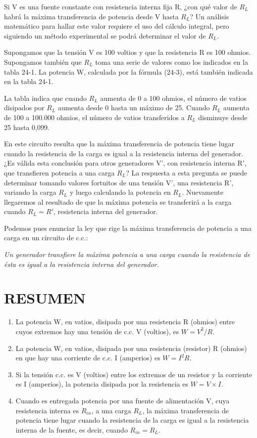 \documentclass[12pt]{article}
\begin{document}
Si V es una fuente constante con resistencia interna fija R, ¿con qué valor de $R_L$ habrá la máxima transferencia de potencia desde V hasta $R_L$? Un análisis matemático para hallar este valor requiere el uso del cálculo integral, pero siguiendo un método experimental se podrá determinar el valor de $R_L$.

Supongamos que la tensión V es 100 voltios y que la resistencia R es 100 ohmios. Supongamos también que $R_L$ toma una serie de valores como los indicados en la tabla 24-1. La potencia W, calculada por la fórmula (24-3), está también indicada en la tabla 24-1.

La tabla indica que cuando $R_L$ aumenta de 0 a 100 ohmios, el número de vatios disipados por $R_L$ aumenta desde 0 hasta un máximo de 25. Cuando $R_L$ aumenta de 100 a 100.000 ohmios, el número de vatios transferidos a $R_L$ disminuye desde 25 hasta 0,099.

En este circuito resulta que la máxima transferencia de potencia tiene lugar cuando la resistencia de la carga es igual a la resistencia interna del generador. ¿Es válida esta conclusión para otros generadores V', con resistencia interna R', que transfieren potencia a una carga $R_L$? La respuesta a esta pregunta se puede determinar tomando valores fortuitos de una tensión V', una resistencia R', variando la carga $R_L$ y luego calculando la potencia en $R_L$. Nuevamente llegaremos al resultado de que la máxima potencia se transferirá a la carga cuando $R_L = R'$, resistencia interna del generador.

Podemos pues enunciar la ley que rige la máxima transferencia de potencia a una carga en un circuito de c.c.:

\textit{Un generador transfiere la máxima potencia a una carga cuando la resistencia de ésta es igual a la resistencia interna del generador.}

\section*{RESUMEN}
\begin{enumerate}
    \item La potencia W, en vatios, disipada por una resistencia R (ohmios) entre cuyos extremos hay una tensión de c.c. V (voltios), es $W = V^2/R$.
    \item La potencia W, en vatios, disipada por una resistencia (resistor) R (ohmios) en que hay una corriente de c.c. I (amperios) es $W = I^2R$.
    \item Si la tensión c.c. es V (voltios) entre los extremos de un resistor y la corriente es I (amperios), la potencia disipada por la resistencia es $W = V \times I$.
    \item Cuando es entregada potencia por una fuente de alimentación V, cuya resistencia interna es $R_{in}$, a una carga $R_L$, la máxima transferencia de potencia tiene lugar cuando la resistencia de la carga es igual a la resistencia interna de la fuente, es decir, cuando $R_{in} = R_L$.
\end{enumerate}
\end{document}
